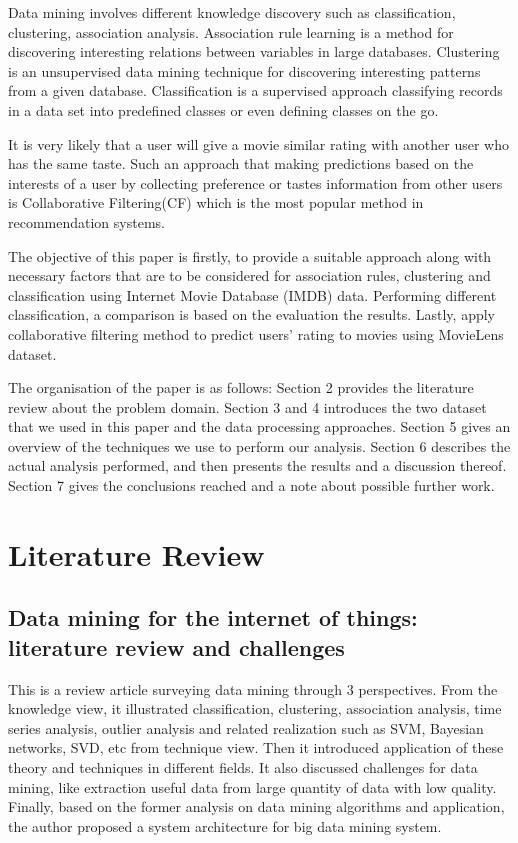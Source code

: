\documentclass[conference]{IEEEtran}
\begin{document}
Data mining involves different knowledge discovery such as classification, clustering, association analysis\cite{Usama}. Association rule learning is a method for discovering interesting relations between variables in large databases. Clustering is an unsupervised data mining technique for discovering interesting patterns from a given database. Classification is a supervised approach classifying records in a data set into predefined classes or even defining classes on the go.

It is very likely that a user will give a movie similar rating with another user who has the same taste. Such an approach that making predictions based on the interests of a user by collecting preference or tastes information from other users is Collaborative Filtering(CF) which is the most popular method in recommendation systems.
 
The objective of this paper is firstly, to provide a suitable approach along with necessary factors that are to be considered for association rules, clustering and classification using Internet Movie Database (IMDB) data. Performing different classification, a comparison is based on the evaluation the results. Lastly, apply collaborative filtering method to predict users' rating to movies using MovieLens dataset.

The organisation of the paper is as follows: Section 2 provides the literature review about the problem domain. Section 3 and 4 introduces the two dataset that we used in this paper and the data processing approaches. Section 5 gives an overview of the techniques we use to perform our analysis. Section 6 describes the actual analysis performed, and then presents the results and a discussion thereof. Section 7 gives the conclusions reached and a note about possible further work.


\section{Literature Review}
\subsection{Data mining for the internet of things: literature review and challenges\cite{fengchen}}
This is a review article surveying data mining through 3 perspectives. From the knowledge view, it illustrated classification, clustering, association analysis, time series analysis, outlier analysis and related realization such as SVM, Bayesian networks, SVD, etc from technique view. Then it introduced application of these theory and techniques in different fields. It also discussed challenges for data mining, like extraction useful data from large quantity of data with low quality. Finally, based on the former analysis on data mining algorithms and application, the author proposed a system architecture for big data mining system.
\end{document}
